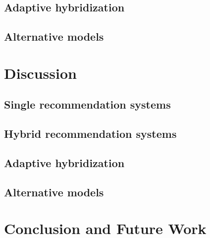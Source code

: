 \documentclass[10pt]{reportMaster}
\begin{document}
\section{Adaptive hybridization}

\section{Alternative models}







\chapter{Discussion}

\section{Single recommendation systems}

\section{Hybrid recommendation systems}

\section{Adaptive hybridization}

\section{Alternative models}







\chapter{Conclusion and Future Work}
\end{document}
